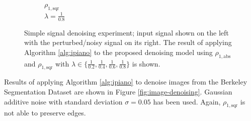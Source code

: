 \documentclass[onecolumn,final,a4paper,13pt,reqno]{siamart}
\begin{document}
\begin{figure}[t]
\begin{subfigure}[t]{0.08\textwidth}
		\scriptsize $\rho_{1,\text{sqr}}$\\[2px]
		\scriptsize $\lambda = \frac{1}{0.8}$
	\end{subfigure}
	\caption{Simple signal denoising experiment; input signal shown on the left with the perturbed/noisy signal on its right. The result of applying Algorithm \ref{alg:ipiano} to the proposed denoising model using $\rho_{1, \text{abs}}$ and $\rho_{1,\text{sqr}}$ with $\lambda \in \{\frac{1}{0.2},\frac{1}{0.4},\frac{1}{0.6},\frac{1}{0.8}\}$ is shown.}
	\label{fig:signal-denoising}
\end{figure}

Results of applying Algorithm \ref{alg:ipiano} to denoise images from the Berkeley Segmentation Dataset \cite{ArbelaezMaireFowlkesMalik:2011} are shown in Figure \ref{fig:image-denoising}. Gaussian additive noise with standard deviation $\sigma = 0.05$ has been used. Again, $\rho_{1,\text{sqr}}$ is not able to preserve edges.
\end{document}
